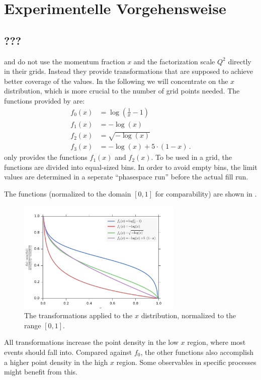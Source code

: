
\chapter{Experimentelle Vorgehensweise}
\section{???}
\label{sec:xtransform}
\appl{} and \fnlo{} do not use the momentum fraction $x$ and the factorization scale $Q^2$ directly in their grids.
Instead they provide transformations that are supposed to achieve better coverage of the values.
In the following we will concentrate on the $x$ distribution, which is more crucial to the number of grid points needed.
The functions provided by \appl{} are:
%
\begin{align}
	f_0(x)	&= \log(\frac{1}{x} -1) \\
	f_1(x)	&= -\log(x) \\
	f_2(x)	&= \sqrt{-\log(x)} \\
	f_3(x)	&= -\log(x) + 5 \cdot (1-x) \, .
\end{align}
%
\fnlo{} only provides the functions $f_1(x)$ and $f_2(x)$.
To be used in a grid, the functions are divided into equal-sized bins.
In order to avoid empty bins, the limit values are determined in a seperate \enquote{phasespace run} before the actual fill run.

The functions (normalized to the domain $[0,1]$ for comparability) are shown in .
%
\begin{figure}[]
	\includegraphics[width=0.7\textwidth]{images/xtransform.pdf}
	\caption{The transformations applied to the $x$ distribution, normalized to the range $[0,1]$.}
	\label{fig:xtransform}
\end{figure}
%
All transformations increase the point density in the low $x$ region, where most events should fall into.
Compared against $f_0$, the other functions also accomplish a higher point density in the high $x$ region.
Some observables in specific processes might benefit from this.

